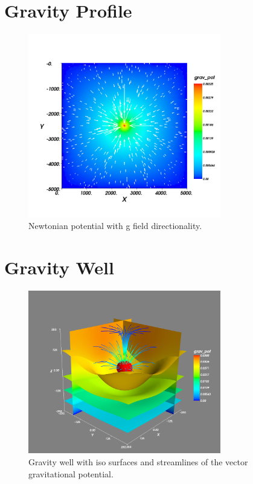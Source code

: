 \section{Gravity Profile}

\begin{figure}[ht]
\centering
\includegraphics[width=0.75\textwidth]{figures/ex10apot.png}
\caption{Newtonian potential with g field directionality.}
\label{fig:ex10pot}
\end{figure}

\section{Gravity Well}

\begin{figure}[htp]
\centering
\includegraphics[width=0.75\textwidth]{figures/ex10bpot.png}
\caption{Gravity well with iso surfaces and streamlines of the vector
gravitational potential.}
\label{fig:ex10bpot}
\end{figure}

